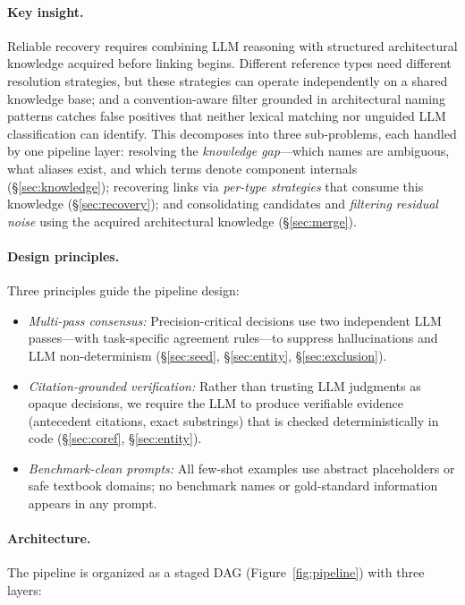 \paragraph{Key insight.}
Reliable recovery requires combining LLM reasoning with
structured architectural knowledge acquired before linking begins.
Different reference types need different resolution strategies,
but these strategies can operate independently on a shared
knowledge base; and a convention-aware filter grounded in
architectural naming patterns catches false positives that
neither lexical matching nor unguided LLM classification can
identify.
This decomposes into three sub-problems, each handled by one
pipeline layer:
resolving the \emph{knowledge gap}---which names are ambiguous,
what aliases exist, and which terms denote component
internals (\S\ref{sec:knowledge});
recovering links via \emph{per-type strategies} that consume
this knowledge (\S\ref{sec:recovery}); and
consolidating candidates and \emph{filtering residual noise}
using the acquired architectural knowledge
(\S\ref{sec:merge}).

\paragraph{Design principles.}
Three principles guide the pipeline design:
\begin{itemize}
    \item \emph{Multi-pass consensus:}
      Precision-critical decisions use two independent LLM
      passes---with task-specific agreement rules---to suppress
      hallucinations and LLM non-determinism (\S\ref{sec:seed},
      \S\ref{sec:entity}, \S\ref{sec:exclusion}).
    \item \emph{Citation-grounded verification:}
      Rather than trusting LLM judgments as opaque decisions, we
      require the LLM to produce verifiable evidence (antecedent
      citations, exact substrings) that is checked deterministically
      in code (\S\ref{sec:coref}, \S\ref{sec:entity}).
    \item \emph{Benchmark-clean prompts:}
      All few-shot examples use abstract placeholders or safe
      textbook domains; no benchmark names or gold-standard
      information appears in any prompt.
\end{itemize}

\paragraph{Architecture.}
The pipeline is organized as a staged DAG
(Figure~\ref{fig:pipeline}) with three layers:

